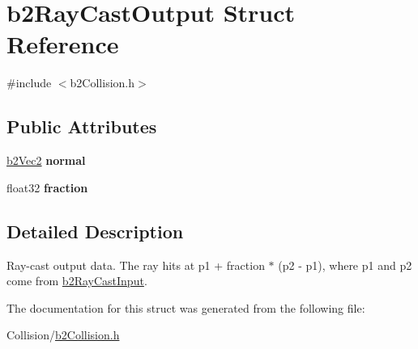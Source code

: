 \hypertarget{structb2RayCastOutput}{}\section{b2\+Ray\+Cast\+Output Struct Reference}
\label{structb2RayCastOutput}


{\ttfamily \#include $<$b2\+Collision.\+h$>$}

\subsection*{Public Attributes}
\begin{DoxyCompactItemize}
\item 
\mbox{\label{structb2RayCastOutput_aa9bbfe75afa23c21e85cb1bd3736529b}} 
\mbox{\hyperlink{structb2Vec2}{b2\+Vec2}} {\bfseries normal}
\item 
\mbox{\label{structb2RayCastOutput_a191c69bb399304bfe30c69e2158b3f29}} 
float32 {\bfseries fraction}
\end{DoxyCompactItemize}


\subsection{Detailed Description}
Ray-\/cast output data. The ray hits at p1 + fraction $\ast$ (p2 -\/ p1), where p1 and p2 come from \mbox{\hyperlink{structb2RayCastInput}{b2\+Ray\+Cast\+Input}}. 

The documentation for this struct was generated from the following file\+:\begin{DoxyCompactItemize}
\item 
Collision/\mbox{\hyperlink{b2Collision_8h}{b2\+Collision.\+h}}\end{DoxyCompactItemize}
